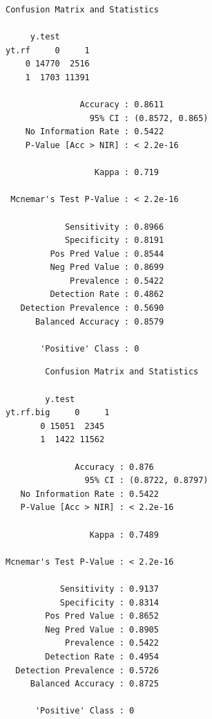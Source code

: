 \documentclass{article}
\begin{document}
\begin{multicols}{2}
    \begin{verbatim}
Confusion Matrix and Statistics

     y.test
yt.rf     0     1
    0 14770  2516
    1  1703 11391
                                         
               Accuracy : 0.8611         
                 95% CI : (0.8572, 0.865)
    No Information Rate : 0.5422         
    P-Value [Acc > NIR] : < 2.2e-16      
                                         
                  Kappa : 0.719          
                                         
 Mcnemar's Test P-Value : < 2.2e-16      
                                         
            Sensitivity : 0.8966         
            Specificity : 0.8191         
         Pos Pred Value : 0.8544         
         Neg Pred Value : 0.8699         
             Prevalence : 0.5422         
         Detection Rate : 0.4862         
   Detection Prevalence : 0.5690         
      Balanced Accuracy : 0.8579         
                                         
       'Positive' Class : 0  
    \end{verbatim}
    \begin{verbatim}
        Confusion Matrix and Statistics

        y.test
yt.rf.big     0     1
       0 15051  2345
       1  1422 11562
                                         
              Accuracy : 0.876           
                95% CI : (0.8722, 0.8797)
   No Information Rate : 0.5422          
   P-Value [Acc > NIR] : < 2.2e-16       
                                         
                 Kappa : 0.7489          
                                         
Mcnemar's Test P-Value : < 2.2e-16       
                                         
           Sensitivity : 0.9137          
           Specificity : 0.8314          
        Pos Pred Value : 0.8652          
        Neg Pred Value : 0.8905          
            Prevalence : 0.5422          
        Detection Rate : 0.4954          
  Detection Prevalence : 0.5726          
     Balanced Accuracy : 0.8725          
                                         
      'Positive' Class : 0               
                             
    \end{verbatim}
\end{multicols}
\end{document}
